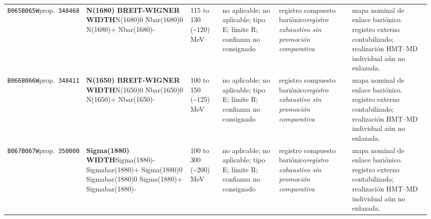 \begin{landscape}
\begin{longtable}{L{1.85cm}L{4.45cm}L{2.35cm}L{4.05cm}L{3.35cm}L{7.15cm}}
\texttt{B065}\newline \texttt{B065W}\newline prop.\ \texttt{348468} & \textbf{N(1680) BREIT-WIGNER WIDTH}\newline N(1680)0 \textbar{}\allowbreak{} Nbar(1680)0 \textbar{}\allowbreak{} N(1680)+ \textbar{}\allowbreak{} Nbar(1680)- & 115 to 130 (\textasciitilde{}120)\,MeV & no aplicable; no aplicable; tipo E; límite R; confianza no consignado & registro compuesto bariónico\newline \emph{registro exhaustivo sin promoción comparativa} & mapa nominal de enlace bariónico. registro externo contabilizado; realización HMT--MD individual aún no enlazada. \\
\texttt{B066}\newline \texttt{B066W}\newline prop.\ \texttt{348411} & \textbf{N(1650) BREIT-WIGNER WIDTH}\newline N(1650)0 \textbar{}\allowbreak{} Nbar(1650)0 \textbar{}\allowbreak{} N(1650)+ \textbar{}\allowbreak{} Nbar(1650)- & 100 to 150 (\textasciitilde{}125)\,MeV & no aplicable; no aplicable; tipo E; límite R; confianza no consignado & registro compuesto bariónico\newline \emph{registro exhaustivo sin promoción comparativa} & mapa nominal de enlace bariónico. registro externo contabilizado; realización HMT--MD individual aún no enlazada. \\
\texttt{B067}\newline \texttt{B067W}\newline prop.\ \texttt{350000} & \textbf{Sigma(1880) WIDTH}\newline Sigma(1880)- \textbar{}\allowbreak{} Sigmabar(1880)+ \textbar{}\allowbreak{} Sigma(1880)0 \textbar{}\allowbreak{} Sigmabar(1880)0 \textbar{}\allowbreak{} Sigma(1880)+ \textbar{}\allowbreak{} Sigmabar(1880)- & 100 to 300 (\textasciitilde{}200)\,MeV & no aplicable; no aplicable; tipo E; límite R; confianza no consignado & registro compuesto bariónico\newline \emph{registro exhaustivo sin promoción comparativa} & mapa nominal de enlace bariónico. registro externo contabilizado; realización HMT--MD individual aún no enlazada. \\

\end{longtable}
\end{landscape}
